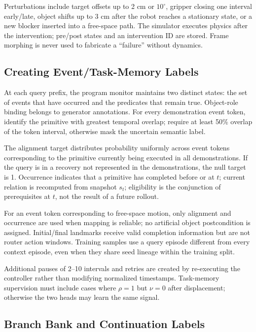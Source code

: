 \documentclass[
  10pt,
]{article}
\begin{document}
Perturbations include target offsets up to 2 cm or \(10^\circ\), gripper closing one interval early/late, object shifts up to 3 cm after the robot reaches a stationary state, or a new blocker inserted into a free-space path. The simulator executes physics after the intervention; pre/post states and an intervention ID are stored. Frame morphing is never used to fabricate a ``failure'' without dynamics.

\hypertarget{tux1ea1o-nhuxe3n-eventtask-memory}{%
\subsection{Creating Event/Task-Memory Labels}\label{tux1ea1o-nhuxe3n-eventtask-memory}}

At each query prefix, the program monitor maintains two distinct states: the set of events that have occurred and the predicates that remain true. Object-role binding belongs to generator annotations. For every demonstration event token, identify the primitive with greatest temporal overlap; require at least 50\% overlap of the token interval, otherwise mask the uncertain semantic label.

The alignment target distributes probability uniformly across event tokens corresponding to the primitive currently being executed in all demonstrations. If the query is in a recovery not represented in the demonstrations, the null target is 1. Occurrence indicates that a primitive has completed before or at \(t\); current relation is recomputed from snapshot \(s_t\); eligibility is the conjunction of prerequisites at \(t\), not the result of a future rollout.

For an event token corresponding to free-space motion, only alignment and occurrence are used when mapping is reliable; no artificial object postcondition is assigned. Initial/final landmarks receive valid completion information but are not router action windows. Training samples use a query episode different from every context episode, even when they share seed lineage within the training split.

Additional pauses of 2--10 intervals and retries are created by re-executing the controller rather than modifying normalized timestamps. Task-memory supervision must include cases where \(\rho=1\) but \(\nu=0\) after displacement; otherwise the two heads may learn the same signal.

\hypertarget{branch-bank-vuxe0-nhuxe3n-continuation}{%
\subsection{Branch Bank and Continuation Labels}\label{branch-bank-vuxe0-nhuxe3n-continuation}}
\end{document}
